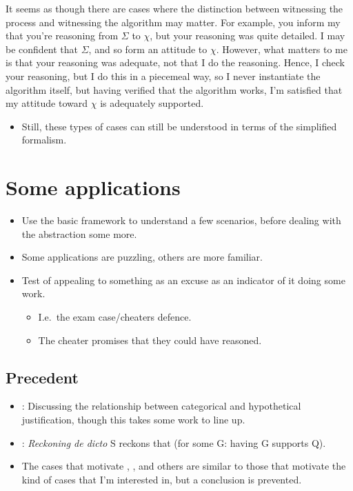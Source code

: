 \documentclass[10pt]{article}
\newcommand{\futin}{\ensuremath{\Sigma}}
\newcommand{\futout}{\ensuremath{\chi}}
\begin{document}
\begin{note}
  It seems as though there are cases where the distinction between witnessing the process and witnessing the algorithm may matter.
  For example, you inform my that you're reasoning from \(\futin\) to \(\futout\), but your reasoning was quite detailed.
  I may be confident that \(\futin\), and so form an attitude to \(\futout\).
  However, what matters to me is that your reasoning was adequate, not that I do the reasoning.
  Hence, I check your reasoning, but I do this in a piecemeal way, so I never instantiate the algorithm itself, but having verified that the algorithm works, I'm satisfied that my attitude toward \(\futout\) is adequately supported.
  \begin{itemize}
  \item Still, these types of cases can still be understood in terms of the simplified formalism.
  \end{itemize}
\end{note}

\section{Some applications}
\label{sec:some-applications}

\begin{itemize}
\item Use the basic framework to understand a few scenarios, before dealing with the abstraction some more.
\item Some applications are puzzling, others are more familiar.
\item Test of appealing to something as an excuse as an indicator of it doing some work.
  \begin{itemize}
  \item I.e.\ the exam case/cheaters defence.
  \item The cheater promises that they could have reasoned.
  \end{itemize}
\end{itemize}


\subsection{Precedent}
\label{sec:precedent}

\begin{itemize}
\item \textcite{Pryor:2018aa}: Discussing the relationship between categorical and hypothetical justification, though this takes some work to line up.
\item \textcite{Siegel:2019aa}: \emph{Reckoning de dicto} S reckons that (for some G: having G supports Q).
\item The cases that motivate \textcite{Worsnip:2018aa}, \textcite{Fogal:2019aa}, and others are similar to those that motivate the kind of cases that I'm interested in, but a conclusion is prevented.
\end{itemize}
\end{document}
